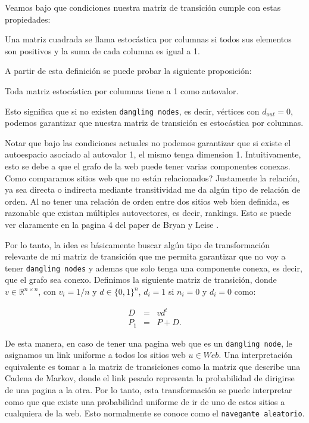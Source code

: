 Veamos bajo que condiciones nuestra matriz de transición cumple con estas propiedades:

\begin{definition}
Una matriz cuadrada se llama estocástica por columnas si todos sus elementos son positivos y la suma de cada columna es igual a 1.
\end{definition}

A partir de esta definición se puede probar la siguiente proposición:
\begin{proposition}
Toda matriz estocástica por columnas tiene a 1 como autovalor.
\end{proposition}

Esto significa que si no existen \texttt{dangling nodes}, es decir, vértices con $d_{out} = 0$, podemos garantizar que nuestra matriz de transición es estocástica por columnas.

Notar que bajo las condiciones actuales no podemos garantizar que si existe el autoespacio asociado al autovalor 1, el mismo tenga dimension 1. Intuitivamente, esto se debe a que el grafo de la web puede tener varias componentes conexas. Como comparamos sitios web que no están relacionados? Justamente la relación, ya sea directa o indirecta mediante transitividad me da algún tipo de relación de orden. Al no tener una relación de orden entre dos sitios web bien definida, es razonable que existan múltiples autovectores, es decir, rankings. Esto se puede ver claramente en la pagina 4 del paper de Bryan y Leise \cite{Bryan2006}.

Por lo tanto, la idea es básicamente buscar algún tipo de transformación relevante de mi matriz de transición que me permita garantizar que no voy a tener \texttt{dangling nodes} y ademas que solo tenga una componente conexa, es decir, que el grafo sea conexo. Definimos la siguiente matriz de transición, donde $v \in \mathbb{R}^{n \times n}$, con $v_i = 1 / n$ y $d \in \{0,1\}^n$,  $d_i = 1$ si $n_i = 0$ y $d_i = 0$ como:

\begin{eqnarray*}
D & = & v d^t \\
P_1 & = & P + D.
\end{eqnarray*}

De esta manera, en caso de tener una pagina web que es un \texttt{dangling node}, le asignamos un link uniforme a todos los sitios web $u \in Web$. Una interpretación equivalente es tomar a la matriz de transiciones como la matriz que describe una Cadena de Markov, donde el link pesado representa la probabilidad de dirigirse de una pagina a la otra. Por lo tanto, esta transformación se puede interpretar como que que existe una probabilidad uniforme de ir de uno de estos sitios a cualquiera de la web. Esto normalmente se conoce como el \texttt{navegante aleatorio}.

